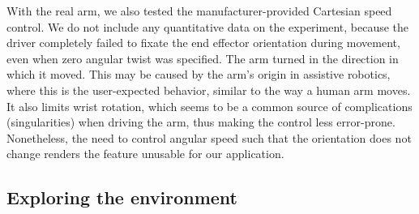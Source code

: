 \documentclass[buriama8_dp.tex]{subfiles}
\begin{document}
With the real arm, we also tested the manufacturer-provided Cartesian speed control. We do not include any quantitative data on the experiment, because the driver completely failed to fixate the end effector orientation during movement, even when zero angular twist was specified. The arm turned in the direction in which it moved. This may be caused by the arm's origin in assistive robotics, where this is the user-expected behavior, similar to the way a human arm moves. It also limits wrist rotation, which seems to be a common source of complications (singularities) when driving the arm, thus making the control less error-prone. Nonetheless, the need to control angular speed such that the orientation does not change renders the feature unusable for our application.

\subsection{Exploring the environment}
\label{subsec:label}
\end{document}
